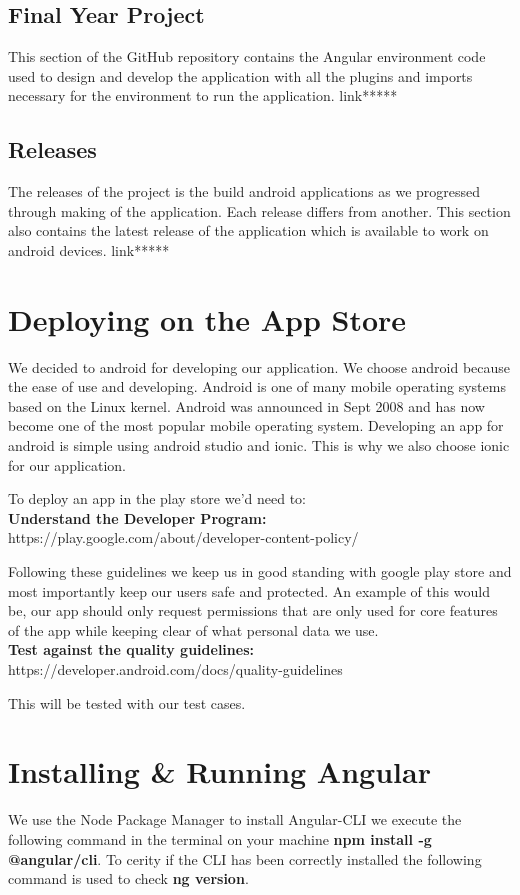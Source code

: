 \documentclass[a4paper,12pt]{report}
\begin{document}
\subsection{Final Year Project}
This section of the GitHub repository contains the Angular environment code used to design and develop the application with all the plugins and imports necessary for the environment to run the application. 
link*****
\subsection{Releases}
The releases of the project is the build android applications as we progressed through making of the application. Each release differs from another. This section also contains the latest release of the application which is available to work on android devices. 
link***** 

\section{Deploying on the App Store}
We decided to android for developing our application. We choose android because the ease of use and developing. Android is one of many mobile operating systems based on the Linux kernel. Android was announced in Sept 2008 and has now become one of the most popular mobile operating system. Developing an app for android is simple using android studio and ionic. This is why we also choose ionic for our application. 

To deploy an app in the play store we'd need to:
\\
\textbf{Understand the Developer Program:} https://play.google.com/about/developer-content-policy/

Following these guidelines we keep us in good standing with google play store and most importantly keep our users safe and protected. An example of this would be, our app should only request permissions that are only used for core features of the app while keeping clear of what personal data we use.
\\
\textbf{Test against the quality guidelines:} https://developer.android.com/docs/quality-guidelines

This will be tested with our test cases.

\section{Installing \& Running Angular}
We use the Node Package Manager to install Angular-CLI we execute the following command in the terminal on your machine \textbf{npm install -g @angular/cli}. To cerity if the CLI has been correctly installed the following command is used to check \textbf{ng version}.
\end{document}
